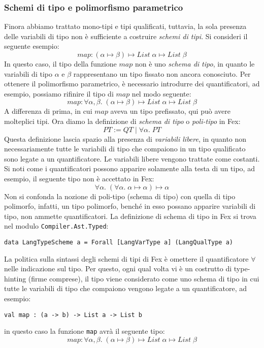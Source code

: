 \documentclass[10pt,a4paper]{article}
\begin{document}
\hypertarget{Schemi di tipo e polimorfismo parametrico}{\subsubsection{Schemi di tipo e polimorfismo parametrico}}
Finora abbiamo trattato mono-tipi e tipi qualificati, tuttavia, la sola presenza delle variabili di tipo non è sufficiente
a costruire \textit{schemi di tipi}. Si consideri il seguente esempio:
\[ map : (\alpha \mapsto \beta) \mapsto List \; \alpha \mapsto List \; \beta \]
In questo caso, il tipo della funzione $ map $ non è uno \textit{schema di tipo}, in quanto le variabili di tipo
$ \alpha $ e $ \beta $
rappresentano un tipo fissato non ancora conosciuto. Per ottenere il polimorfismo parametrico, è necessario introdurre
dei quantificatori, ad esempio, possiamo rifinire il tipo di $ map $ nel modo seguente:
\[ map : \forall \alpha, \beta . \; (\alpha \mapsto \beta) \mapsto List \; \alpha \mapsto List \; \beta \]
A differenza di prima, in cui $ map $ aveva un tipo prefissato, qui può avere molteplici tipi. Ora diamo la definizione
di \textit{schema di tipo} o \textit{poli-tipo} in Fex:
\[ PT := QT \; | \; \forall \alpha. \; PT \]
Questa definizione lascia spazio alla presenza di \textit{variabili libere}, in quanto non necessariamente tutte le
variabili di tipo che compaiono in un tipo qualificato sono legate a un quantificatore. Le variabili libere vengono
trattate come costanti. Si noti come i quantificatori possono apparire solamente alla testa di un tipo, ad esempio, il
seguente tipo non è accettato in Fex:
\[ \forall \alpha . \; (\forall \alpha . \; \alpha \mapsto \alpha) \mapsto \alpha \]
Non si confonda la nozione di poli-tipo (schema di tipo) con quella di tipo polimorfo, infatti, un tipo polimorfo, benché
in esso possano apparire variabili di tipo, non ammette quantificatori.
La definizione di schema di tipo in Fex si trova nel modulo \texttt{Compiler.Ast.Typed}:
\begin{lstlisting}
data LangTypeScheme a = Forall [LangVarType a] (LangQualType a)
\end{lstlisting}
La politica sulla sintassi degli schemi di tipi di Fex è omettere il quantificatore $ \forall $ nelle indicazione sul tipo.
Per questo, ogni qual
volta vi è un costrutto di type-hinting (firme comprese), il tipo viene considerato come uno schema di tipo in cui tutte
le variabili di tipo che compaiono vengono legate a un quantificatore, ad esempio:
\begin{lstlisting}
val map : (a -> b) -> List a -> List b
\end{lstlisting}
in questo caso la funzione \texttt{map} avrà il seguente tipo:
\[ map : \forall \alpha, \beta . \; (\alpha \mapsto \beta) \mapsto List \; \alpha \mapsto List \; \beta \]
\end{document}
